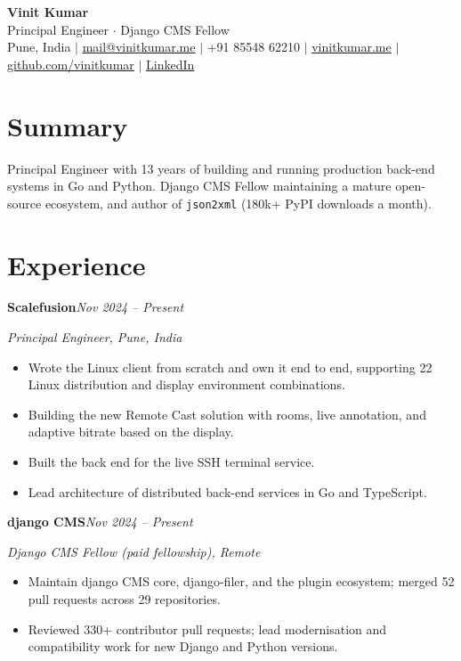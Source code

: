 \documentclass[10pt,a4paper]{article}
\newcommand{\role}[4]{%
  \par\vspace{3pt}%
  \textbf{#1}\hfill\textit{#4}\par
  \textit{#2\if\relax\detokenize{#3}\relax\else, #3\fi}\par
  \vspace{1pt}%
}
\newenvironment{points}
  {\begin{itemize}[leftmargin=1.4em, itemsep=0.5pt, topsep=2pt, parsep=0pt]}
  {\end{itemize}}
\begin{document}
\begin{center}
  {\LARGE\bfseries Vinit Kumar}\\[2pt]
  {\normalsize Principal Engineer $\cdot$ Django CMS Fellow}\\[3pt]
  \small
  Pune, India $\vert$
  \href{mailto:mail@vinitkumar.me}{mail@vinitkumar.me} $\vert$
  +91 85548 62210 $\vert$
  \href{https://vinitkumar.me}{vinitkumar.me} $\vert$
  \href{https://github.com/vinitkumar}{github.com/vinitkumar} $\vert$
  \href{https://www.linkedin.com/in/vinitatlinkedin/}{LinkedIn}
\end{center}

\vspace{-2pt}

\section*{Summary}

Principal Engineer with 13 years of building and running production back-end
systems in Go and Python. Django CMS Fellow maintaining a mature open-source
ecosystem, and author of \texttt{json2xml} (180k+ PyPI downloads a month).

\section*{Experience}

\role{Scalefusion}{Principal Engineer}{Pune, India}{Nov 2024 -- Present}
\begin{points}
  \item Wrote the Linux client from scratch and own it end to end, supporting 22 Linux distribution and display environment combinations.
  \item Building the new Remote Cast solution with rooms, live annotation, and adaptive bitrate based on the display.
  \item Built the back end for the live SSH terminal service.
  \item Lead architecture of distributed back-end services in Go and TypeScript.
\end{points}

\role{django CMS}{Django CMS Fellow (paid fellowship)}{Remote}%
  {Nov 2024 -- Present}
\begin{points}
  \item Maintain django CMS core, django-filer, and the plugin ecosystem;
        merged 52 pull requests across 29 repositories.
  \item Reviewed 330+ contributor pull requests; lead modernisation and
        compatibility work for new Django and Python versions.
\end{points}
\end{document}
